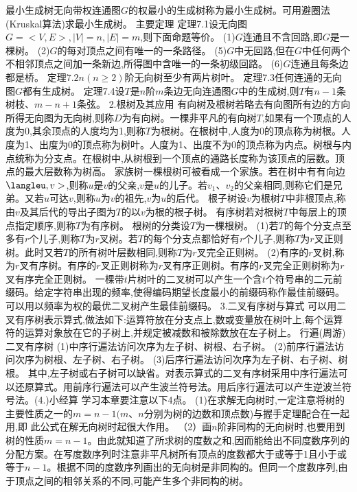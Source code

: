 最小生成树无向带权连通图$G$的权最小的生成树称为最小生成树。可用避圈法(Kruskal算法)求最小生成树。
{主要定理}
定理7.1设无向图$G=<V,E>,|V|=n,|E|=m$,则下面命题等价。
(1)$G$连通且不含回路,即$G$是一棵树。
(2)$G$的每对顶点之间有唯一的一条路径。
(5)$G$中无回路,但在$G$中任何两个不相邻顶点之间加一条新边,所得图中含唯一的一条初级回路。
(6)$G$连通且每条边都是桥。
定理$7.2n(n\geqslant2)$阶无向树至少有两片树叶。
定理7.3任何连通的无向图$G$都有生成树。
定理7.4设$T$是$n$阶$m$条边无向连通图$G$中的生成树,则$T$有$n-1$条树枝、$m-n+1$条弦。
{2.根树及其应用}
有向树及根树若略去有向图所有边的方向所得无向图为无向树,则称$D$为有向树。一棵非平凡的有向树$T$,如果有一个顶点的人度为0,其余顶点的人度均为1,则称$T$为根树。在根树中,人度为0的顶点称为树根。人度为1、出度为0的顶点称为树叶。人度为1、出度不为0的顶点称为内点。树根与内点统称为分支点。在根树中,从树根到一个顶点的通路长度称为该顶点的层数。顶点的最大层数称为树高。
家族树一棵根树可被看成一个家族。若在树中有有向边$\langleu,v>$,则称$u$是$v$的父亲,$v$是$u$的儿子。若$v_{1}、v_{2}$的父亲相同,则称它们是兄弟。又若$u$可达$v$,则称$u$为$v$的祖先,$v$为$u$的后代。
根子树设$v$为根树$T$中非根顶点,称由$v$及其后代的导出子图为$T$的以$v$为根的根子树。
有序树若对根树$T$中每层上的顶点指定顺序,则称$T$为有序树。
根树的分类设$T$为一棵根树。
(1)若$T$的每个分支点至多有$r$个儿子,则称$T$为$r$叉树。若$T$的每个分支点都恰好有$r$个儿子,则称$T$为$r$叉正则树。此时又若$T$的所有树叶层数相同,则称$T$为$r$叉完全正则树。
(2)有序的$r$叉树,称为$r$叉有序树。有序的$r$叉正则树称为$r$叉有序正则树。有序的$r$叉完全正则树称为$r$叉有序完全正则树。
一棵带$t$片树叶的二叉树可以产生一个含$t$个符号串的二元前缀码。给定字符串出现的频率,使得编码期望长度最小的前缀码称作最佳前缀码。可以用以频率为权的最优二叉树产生最佳前缀码。
{3.二叉有序树与算式}
可以用二叉有序树表示算式,做法如下:运算符放在分支点上,数或变量放在树叶上,每个运算符的运算对象放在它的子树上,并规定被减数和被除数放在左子树上。
行遍(周游)二叉有序树
(1)中序行遍法访问次序为左子树、树根、右子树。
(2)前序行遍法访问次序为树根、左子树、右子树。
(3)后序行遍法访问次序为左子树、右子树、树根。
其中,左子树或右子树可以缺省。对表示算式的二叉有序树采用中序行遍法可以还原算式。用前序行遍法可以产生波兰符号法。用后序行遍法可以产生逆波兰符号法。(4.)小经算
学习本章要注意以下4点。
(1)在求解无向树时,一定注意将树的主要性质之一的$m=n-1(m、n$分别为树的边数和顶点数)与握手定理配合在一起用,即
此公式在解无向树时起很大作用。
（2）画$n$阶非同构的无向树时,也要用到树的性质$m=n-1$。由此就知道了所求树的度数之和,因而能给出不同度数序列的分配方案。在写度数序列时注意非平凡树所有顶点的度数都大于或等于1且小于或等于$n-1$。根据不同的度数序列画出的无向树是非同构的。但同一个度数序列,由于顶点之间的相邻关系的不同,可能产生多个非同构的树。
